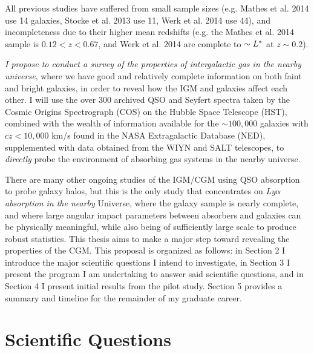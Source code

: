 \documentclass[iop]{emulateapj-rtx4}
\begin{document}

All previous studies have suffered from small sample sizes (e.g. Mathes et al. 2014 use 14 galaxies, Stocke et al. 2013 use 11, Werk et al. 2014 use 44), and incompleteness due to their higher mean redshifts (e.g. the Mathes et al. 2014 sample is $0.12 <z<0.67$, and Werk et al. 2014 are complete to $\sim L^{\**}$ at $z\sim0.2$).

\textit{I propose to conduct a survey of the properties of intergalactic gas in the nearby universe}, where we have good and relatively complete information on both faint and bright galaxies, in order to reveal how the IGM and galaxies affect each other. I will use the over 300 archived QSO and Seyfert spectra taken by the Cosmic Origins Spectrograph (COS) on the Hubble Space Telescope (HST), combined with the wealth of information available for the $\sim100,000$ galaxies with $cz<10,000$ km/s found in the NASA Extragalactic Database (NED), supplemented with data obtained from the WIYN and SALT telescopes, to \textit{directly} probe the environment of absorbing gas systems in the nearby universe. 

There are many other ongoing studies of the IGM/CGM using QSO absorption to probe galaxy halos, but this is the only study that concentrates on \textit{Ly$\alpha$ absorption in the nearby} Universe, where the galaxy sample is nearly complete, and where large angular impact parameters between absorbers and galaxies can be physically meaningful, while also being of sufficiently large scale to produce robust statistics. This thesis aims to make a major step toward revealing the properties of the CGM. This proposal is organized as follows: in Section 2 I introduce the major scientific questions I intend to investigate, in Section 3 I present the program I am undertaking to answer said scientific questions, and in Section 4 I present initial results from the pilot study. Section 5 provides a summary and timeline for the remainder of my graduate career.


\vspace{15pt}

\section{Scientific Questions}
\end{document}
